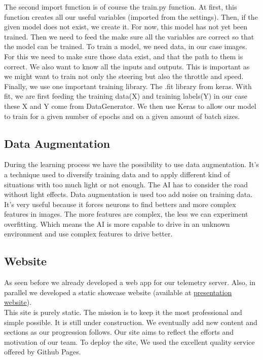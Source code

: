 \documentclass[12pt]{article}
\begin{document}
The second import function is of course the train.py function. At first, this function creates all our useful variables (imported from the settings). Then, if the given model does not exist, we create it. For now, this model has not yet been trained.  Then we need to feed the make sure all the variables are correct so that the model can be trained.  To train a model, we need data, in our case images. For this we need to make sure those data exist, and that the path to them is correct.  
We also want to know all the inputs and outputs. This is important as we might want to train not only the steering but also the throttle and speed.  
Finally, we use one important training library. The .fit library from keras. With fit, we are first feeding the training data(X) and training labels(Y) in our case these X and Y come from DataGenerator. We then use Keras to allow our model to train for a given number of epochs and on a given amount of batch sizes. 

\subsection{Data Augmentation}
During the learning process we have the possibility to use data augmentation. It’s a technique used to diversify training data and to apply different kind of situations with too much light or not enough. The AI has to consider the road without light effects. Data augmentation is used too add noise on training data. It’s very useful because it forces neurons to find betters and more complex features in images. The more features are complex, the less we can experiment overfitting. Which means the AI is more capable to drive in an unknown environment and use complex features to drive better.
\newpage

\subsection{Website}
As seen before we already developed a web app for our telemetry server. Also, in parallel we developed a static showcase website (available at \href{https://autonomobile.github.io/}{presentation website}). \\

This site is purely static. The mission is to keep it the most professional and simple possible. It is still under construction. We eventually add new content and sections as our progression follows. Our site aims to reflect the efforts and motivation of our team. To deploy the site, We used the excellent quality service offered by Github Pages. \\
\end{document}
